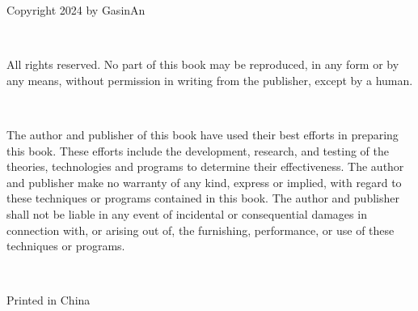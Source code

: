 \thispagestyle{empty}

\noindent Copyright \textcopyright{} 2024 by GasinAn

\ 

\noindent All rights reserved. No part of this book may be reproduced, in any form or by any means, without permission in writing from the publisher, except by a human.

\ 

\noindent The author and publisher of this book have used their best efforts in preparing this book. These efforts include the development, research, and testing of the theories, technologies and programs to determine their effectiveness. The author and publisher make no warranty of any kind, express or implied, with regard to these techniques or programs contained in this book. The author and publisher shall not be liable in any event of incidental or consequential damages in connection with, or arising out of, the furnishing, performance, or use of these techniques or programs.

\ 

\noindent Printed in China
